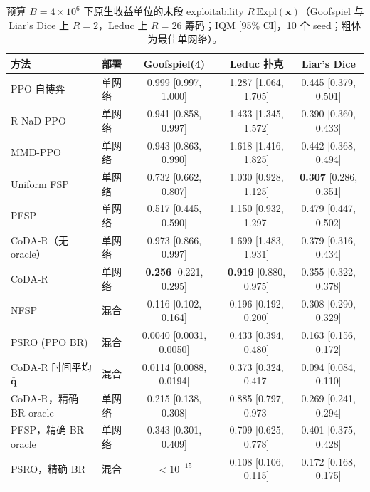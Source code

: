 \documentclass{article}
\theoremstyle{plain}
\theoremstyle{remark}
\newcommand{\Expl}{\mathrm{Expl}}
\newcommand{\bx}{{\bm{x}}}
\newcommand{\bq}{{\bm{q}}}
\newcommand{\codar}{CoDA-R}
\newcommand{\rnad}{R-NaD-PPO}
\begin{document}
\begin{table}[t]
\caption{预算 $B=4\times10^6$ 下原生收益单位的末段 exploitability $R\,\Expl(\bx)$（Goofspiel 与 Liar's Dice 上 $R=2$，Leduc 上 $R=26$ 筹码；IQM [95\% CI]，10 个 seed；粗体为最佳单网络）。}
\label{tab:main}
\begin{center}
\scriptsize
\setlength{\tabcolsep}{3pt}
\begin{tabular}{llccc}
\toprule
方法 & 部署 & Goofspiel(4) & Leduc 扑克 & Liar's Dice \\
\midrule
PPO 自博弈 & 单网络 & 0.999 [0.997, 1.000] & 1.287 [1.064, 1.705] & 0.445 [0.379, 0.501] \\
\rnad{} & 单网络 & 0.941 [0.858, 0.997] & 1.433 [1.345, 1.572] & 0.390 [0.360, 0.433] \\
MMD-PPO & 单网络 & 0.943 [0.863, 0.990] & 1.618 [1.416, 1.825] & 0.442 [0.368, 0.494] \\
Uniform FSP & 单网络 & 0.732 [0.662, 0.807] & 1.030 [0.928, 1.125] & \textbf{0.307} [0.286, 0.351] \\
PFSP & 单网络 & 0.517 [0.445, 0.590] & 1.150 [0.932, 1.297] & 0.479 [0.447, 0.502] \\
\codar{}（无 oracle） & 单网络 & 0.973 [0.866, 0.997] & 1.699 [1.483, 1.931] & 0.379 [0.316, 0.434] \\
\codar{} & 单网络 & \textbf{0.256} [0.221, 0.295] & \textbf{0.919} [0.880, 0.975] & 0.355 [0.322, 0.378] \\
\midrule
NFSP & 混合 & 0.116 [0.102, 0.164] & 0.196 [0.192, 0.200] & 0.308 [0.290, 0.329] \\
PSRO (PPO BR) & 混合 & 0.0040 [0.0031, 0.0050] & 0.433 [0.394, 0.480] & 0.163 [0.156, 0.172] \\
\codar{} 时间平均 $\bar{\bq}$ & 混合 & 0.0114 [0.0088, 0.0194] & 0.373 [0.324, 0.417] & 0.094 [0.084, 0.110] \\
\midrule
\codar{}，精确 BR oracle & 单网络 & 0.215 [0.138, 0.308] & 0.885 [0.797, 0.973] & 0.269 [0.241, 0.294] \\
PFSP，精确 BR oracle & 单网络 & 0.343 [0.301, 0.409] & 0.709 [0.625, 0.778] & 0.401 [0.375, 0.428] \\
PSRO，精确 BR & 混合 & $<10^{-15}$ & 0.108 [0.106, 0.115] & 0.172 [0.168, 0.175] \\
\bottomrule
\end{tabular}
\end{center}
\end{table}
\end{document}
